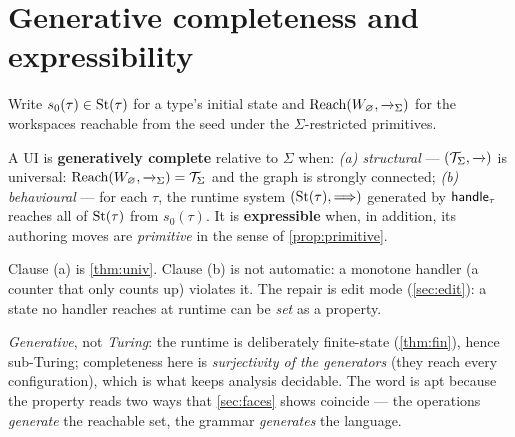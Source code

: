 \documentclass[../uxoxo-main]{subfiles}
\begin{document}
\section{Generative completeness and expressibility}\label{sec:gc}
Write $s_0(\tau)\in\mathrm{St}(\tau)$ for a type's initial state and
$\operatorname{Reach}(W_{\varnothing},\xrightarrow{\,\,}_\Sigma)$ for the workspaces reachable from the seed under
the $\Sigma$-restricted primitives.

\begin{definition}\label{def:gc}
A UI is \textbf{generatively complete} relative to $\Sigma$ when:
\emph{(a) structural} --- $(\mathcal{T}_\Sigma,\xrightarrow{\,\,})$ is universal:
$\operatorname{Reach}(W_{\varnothing},\xrightarrow{\,\,}_\Sigma)=\mathcal{T}_\Sigma$ and the graph is strongly
connected; \emph{(b) behavioural} --- for each $\tau$, the runtime system
$(\mathrm{St}(\tau),\overset{}{\Longrightarrow})$ generated by $\mathsf{handle}_\tau$ reaches all of $\mathrm{St}(\tau)$
from $s_0(\tau)$. It is \textbf{expressible} when, in addition, its authoring
moves are \emph{primitive} in the sense of \cref{prop:primitive}.
\end{definition}

Clause (a) is \cref{thm:univ}. Clause (b) is not automatic: a monotone handler
(a counter that only counts up) violates it. The repair is edit mode
(\cref{sec:edit}): a state no handler reaches at runtime can be \emph{set} as a
property.

\begin{remark}\label{rem:name}
\emph{Generative}, not \emph{Turing}: the runtime is deliberately finite-state
(\cref{thm:fin}), hence sub-Turing; completeness here is \emph{surjectivity of
the generators} (they reach every configuration), which is what keeps analysis
decidable. The word is apt because the property reads two ways that
\cref{sec:faces} shows coincide --- the operations \emph{generate} the reachable
set, the grammar \emph{generates} the language.
\end{remark}

\end{document}
